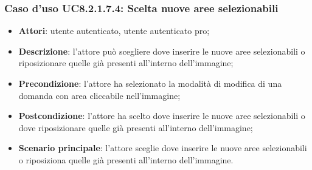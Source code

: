 \subsubsection{Caso d'uso UC8.2.1.7.4: Scelta nuove aree selezionabili}
\begin{itemize}
	\item \textbf{Attori}: utente autenticato, utente autenticato pro;
	\item \textbf{Descrizione}: l'attore può scegliere dove inserire le nuove aree selezionabili o riposizionare quelle già presenti all'interno dell'immagine;
	\item \textbf{Precondizione}: l'attore ha selezionato la modalità di modifica di una domanda con area cliccabile nell'immagine; 
	\item \textbf{Postcondizione}: l'attore ha scelto dove inserire le nuove aree selezionabili o dove riposizionare quelle già presenti all'interno dell'immagine;
	\item \textbf{Scenario principale}: l'attore sceglie dove inserire le nuove aree selezionabili o riposiziona quelle già presenti all'interno dell'immagine. 	
\end{itemize}
